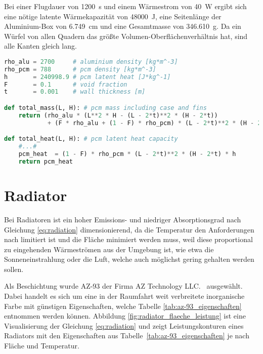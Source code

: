 Bei einer Flugdauer von \SI{1200}{\second} und einem Wärmestrom von \SI{40}{\watt} ergibt sich eine nötige latente Wärmekapazität von
\SI{48000}{\joule}, eine Seitenlänge der Aluminium-Box von \SI{6,749}{\centi\meter} und eine Gesamtmasse von \SI{346,610}{\gram}.
Da ein Würfel von allen Quadern das größte Volumen-Oberflächenverhältnis hat, sind alle Kanten gleich lang.

\begin{lstlisting}[float, language=Python, caption={Berechnung der Masse und Latenten Wärmekapazität des \ac{pcm} in der pcm.py}, label={lst:pcm_python_pseudo}]
rho_alu = 2700     # aluminium density [kg*m^-3]
rho_pcm = 788      # pcm density [kg*m^-3]
h       = 240998.9 # pcm latent heat [J*kg^-1]
F       = 0.1      # void fraction
t       = 0.001    # wall thickness [m]

def total_mass(L, H): # pcm mass including case and fins
    return (rho_alu * (L**2 * H - (L - 2*t)**2 * (H - 2*t))
            + (F * rho_alu + (1 - F) * rho_pcm) * (L - 2*t)**2 * (H - 2*t)) 

def total_heat(L, H): # pcm latent heat capacity
    #...#
    pcm_heat  = (1 - F) * rho_pcm * (L - 2*t)**2 * (H - 2*t) * h
    return pcm_heat
\end{lstlisting}

\section{Radiator}\label{sec:Radiator}

Bei Radiatoren ist ein hoher Emissions- und niedriger Absorptionsgrad nach Gleichung \ref{eq:radiation} dimensionierend, da die Temperatur den Anforderungen nach limitiert ist
und die Fläche minimiert werden muss, weil diese proportional zu eingehenden Wärmeströmen aus der Umgebung ist, wie etwa die Sonneneinstrahlung oder die Luft, welche auch möglichst gering gehalten werden sollen.

Als Beschichtung wurde AZ-93 der Firma AZ Technology LLC.~\cite{AZ-Technology} ausgewählt. Dabei handelt es sich um eine in der Raumfahrt
weit verbreitete inorganische Farbe mit günstigen Eigenschaften, welche Tabelle \ref{tab:az-93_eigenschaften} entnommen werden können.
Abbildung \ref{fig:radiator_flaeche_leistung} ist eine Visualisierung der Gleichung \ref{eq:radiation} und zeigt Leistungskonturen eines
Radiators mit den Eigenschaften aus Tabelle~\ref{tab:az-93_eigenschaften} je nach Fläche und Temperatur.

